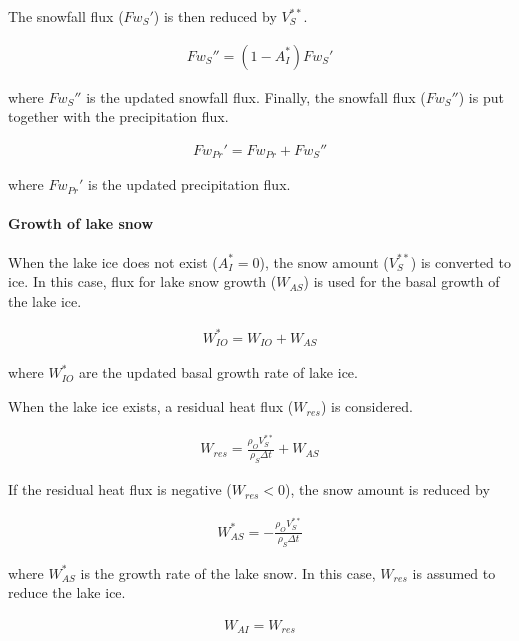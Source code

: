 The snowfall flux (\(Fw_S'\)) is then reduced by \(V_S^{\ast\ast}\).

\begin{eqnarray}
    Fw_S'' = (1-A_I^\ast) Fw_S'
\end{eqnarray}

where \(Fw_S''\) is the updated snowfall flux. Finally, the snowfall flux (\(Fw_S''\)) is put together with the precipitation flux.

\begin{eqnarray}
    Fw_{Pr}' = Fw_{Pr} + Fw_S''
\end{eqnarray}

where \(Fw_{Pr}'\) is the updated precipitation flux.

\hypertarget{growth-of-lake-snow}{%
\paragraph{Growth of lake snow}\label{growth-of-lake-snow}}

When the lake ice does not exist (\(A_I^\ast=0\)), the snow amount (\(V_S^{\ast\ast}\)) is converted to ice. In this case, flux for lake snow growth (\(W_{AS}\)) is used for the basal growth of the
lake ice.

\begin{eqnarray}
 W_{IO}^\ast = W_{IO} + W_{AS}
\end{eqnarray}

where \(W_{IO}^\ast\) are the updated basal growth rate of lake ice.

When the lake ice exists, a residual heat flux (\(W_{res}\)) is considered.

\begin{eqnarray}
    W_{res} = \frac{\rho_OV_S^{\ast\ast}}{\rho_S \Delta t}+ W_{AS}
\end{eqnarray}

If the residual heat flux is negative (\(W_{res}<0\)), the snow amount is reduced by

\begin{eqnarray}
    W_{AS}^\ast = - \frac{\rho_O V_S^{\ast\ast}}{\rho_S \Delta t}
\end{eqnarray}

where \(W_{AS}^\ast\) is the growth rate of the lake snow. In this case, \(W_{res}\) is assumed to reduce the lake ice.

\begin{eqnarray}
    W_{AI} = W_{res}
\end{eqnarray}

